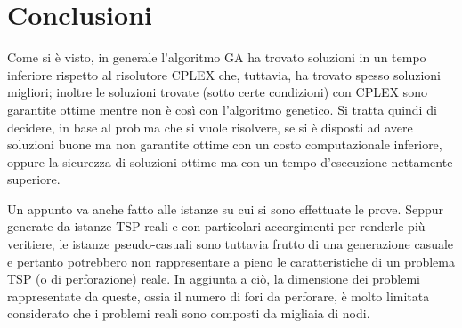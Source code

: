 
\section{Conclusioni}\label{sec:conclusioni}
Come si è visto, in generale l'algoritmo GA ha trovato soluzioni in un tempo inferiore rispetto al
risolutore CPLEX che, tuttavia, ha trovato spesso soluzioni migliori;
inoltre le soluzioni trovate (sotto certe condizioni) con CPLEX sono garantite ottime
mentre non è così con l'algoritmo genetico.
Si tratta quindi di decidere, in base al problma che si vuole risolvere, se si è disposti
ad avere soluzioni buone ma non garantite ottime con un costo computazionale inferiore,
oppure la sicurezza di soluzioni ottime ma con un tempo d'esecuzione nettamente superiore.

Un appunto va anche fatto alle istanze su cui si sono effettuate le prove.
Seppur generate da istanze TSP reali e con particolari accorgimenti per renderle
più veritiere, le istanze pseudo-casuali sono tuttavia frutto di una generazione
casuale e pertanto potrebbero non rappresentare a pieno le caratteristiche di un problema
TSP (o di perforazione) reale.
In aggiunta a ciò, la dimensione dei problemi rappresentate da queste, ossia il numero di fori da perforare,
è molto limitata considerato che i problemi reali sono composti da migliaia di nodi.
